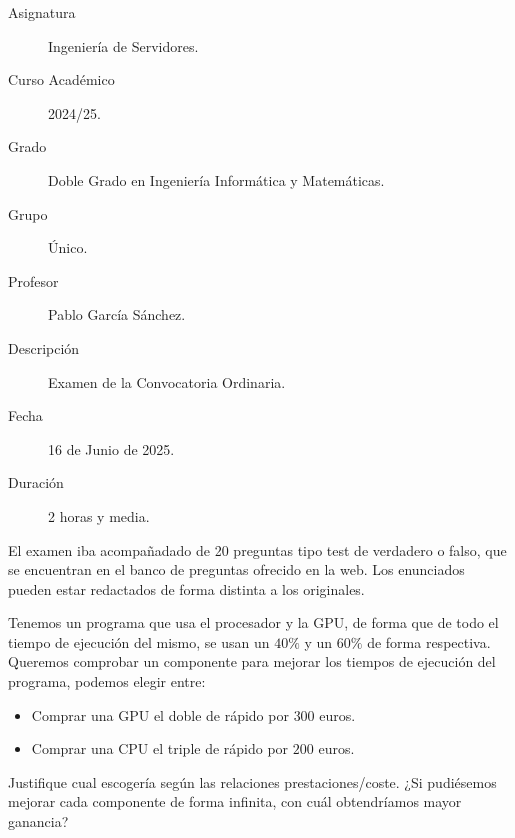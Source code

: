 \documentclass[12pt]{article}
\begin{document}

    
    

    \begin{description}
        \item[Asignatura] Ingeniería de Servidores.
        \item[Curso Académico] 2024/25.
        \item[Grado] Doble Grado en Ingeniería Informática y Matemáticas.
        \item[Grupo] Único.
        \item[Profesor] Pablo García Sánchez.
        \item[Descripción] Examen de la Convocatoria Ordinaria.
        \item[Fecha] 16 de Junio de 2025.
        \item[Duración] 2 horas y media.
    
    \end{description}
    \newpage


    
    El examen iba acompañadado de 20 preguntas tipo test de verdadero o falso, que se encuentran en el banco de preguntas ofrecido en la web. Los enunciados pueden estar redactados de forma distinta a los originales.

    \begin{ejercicio}[1 punto]
        Tenemos un programa que usa el procesador y la GPU, de forma que de todo el tiempo de ejecución del mismo, se usan un  $40\%$ y un $60\%$ de forma respectiva. Queremos comprobar un componente para mejorar los tiempos de ejecución del programa, podemos elegir entre:
        \begin{itemize}
            \item Comprar una GPU el doble de rápido por $300$ euros.
            \item Comprar una CPU el triple de rápido por $200$ euros.
        \end{itemize}
        Justifique cual escogería según las relaciones prestaciones/coste. ¿Si pudiésemos mejorar cada componente de forma infinita, con cuál obtendríamos mayor ganancia?
    \end{ejercicio}
\end{document}

